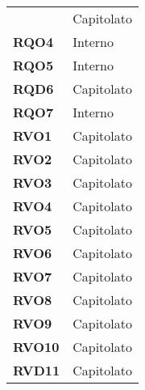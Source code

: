 \begin{longtable}[H]{>{\centering\bfseries}m{8cm} >{\centering\arraybackslash}m{8cm}}
        & Capitolato \\

    RQO4
    
        & Interno \\

    RQO5
    
        & Interno \\

    RQD6

        & Capitolato \\

    RQO7
        & Interno \\
    
     RVO1
 
        & Capitolato \\

    RVO2
   
        & Capitolato \\

    RVO3

        & Capitolato \\

    RVO4

        & Capitolato \\

    RVO5
  
        & Capitolato \\

    RVO6
  
        & Capitolato \\

    RVO7
   
        & Capitolato \\

    RVO8
    
        & Capitolato \\

    RVO9
     
        & Capitolato \\

    RVO10
   
        & Capitolato \\

    RVD11
       
        & Capitolato \\


\end{longtable}